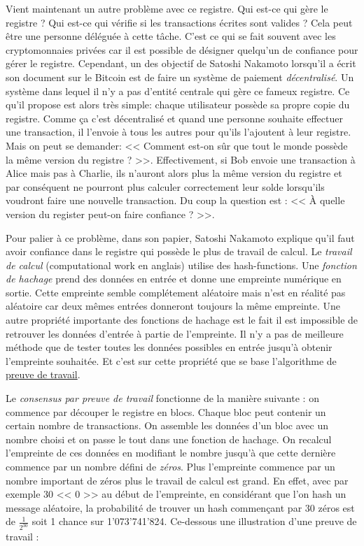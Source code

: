 Vient maintenant un autre problème avec ce registre. Qui est-ce qui gère le registre ? Qui est-ce qui vérifie si les transactions écrites sont valides ? Cela peut être une personne déléguée à cette tâche. C'est ce qui se fait souvent avec les cryptomonnaies privées car il est possible de désigner quelqu'un de confiance pour gérer le registre. Cependant, un des objectif de Satoshi Nakamoto lorsqu'il a écrit son document sur le Bitcoin est de faire un système de paiement \emph{décentralisé}. Un système dans lequel il n'y a pas d'entité centrale qui gère ce fameux registre. Ce qu'il propose est alors très simple: chaque utilisateur possède sa propre copie du registre. Comme ça c'est décentralisé et quand une personne souhaite effectuer une transaction, il l'envoie à tous les autres pour qu'ils l'ajoutent à leur registre. Mais on peut se demander: << Comment est-on sûr que tout le monde possède la même version du registre ? >>. Effectivement, si Bob envoie une transaction à Alice mais pas à Charlie, ils n'auront alors plus la même version du registre et par conséquent ne pourront plus calculer correctement leur solde lorsqu'ils voudront faire une nouvelle transaction. Du coup la question est : << À quelle version du register peut-on faire confiance ? >>.

Pour palier à ce problème, dans son papier, Satoshi Nakamoto explique qu'il faut avoir confiance dans le registre qui possède le plus de travail de calcul. Le \emph{travail de calcul} (computational work en anglais) utilise des \glspl{hash-function}. Une \emph{fonction de hachage} prend des données en entrée et donne une empreinte numérique en sortie. Cette empreinte semble complétement aléatoire mais n'est en réalité pas aléatoire car deux mêmes entrées donneront toujours la même empreinte. Une autre propriété importante des fonctions de hachage est le fait il est impossible de retrouver les données d'entrée à partie de l'empreinte. Il n'y a pas de meilleure méthode que de tester toutes les données possibles en entrée jusqu'à obtenir l'empreinte souhaitée. Et c'est sur cette propriété que se base l'algorithme de \hyperref[consensus:pow]{preuve de travail}.

Le \emph{consensus par preuve de travail} fonctionne de la manière suivante : on commence par découper le registre en blocs. Chaque bloc peut contenir un certain nombre de transactions. On assemble les données d'un bloc avec un nombre choisi et on passe le tout dans une fonction de hachage. On recalcul l'empreinte de ces données en modifiant le nombre jusqu'à que cette dernière commence par un nombre défini de \emph{zéros}. Plus l'empreinte commence par un nombre important de zéros plus le travail de calcul est grand. En effet, avec par exemple 30 << 0 >> au début de l'empreinte, en considérant que l'on hash un message aléatoire, la probabilité de trouver un hash commençant par 30 zéros est de $\frac{1}{2^{30}}$ soit 1 chance sur 1'073'741'824. Ce-dessous une illustration d'une preuve de travail :


